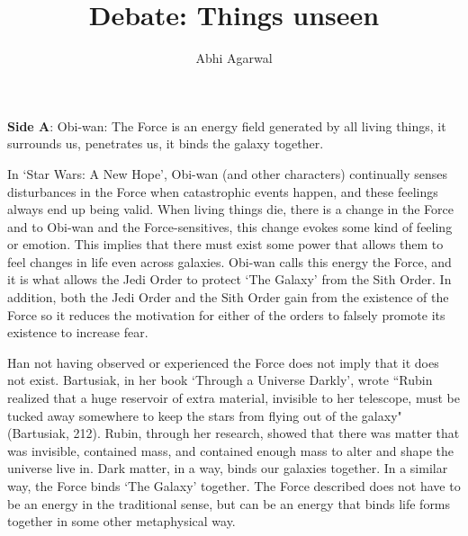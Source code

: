\documentclass[11pt, oneside]{article}
\title{Debate: Things unseen\vspace{-0.4cm}}
\author{Abhi Agarwal\vspace{-1cm}}
\date{}
\begin{document}
\maketitle

\noindent \textbf{Side A}: Obi-wan: The Force is an energy field generated by all living things, it surrounds us, penetrates us, it binds the galaxy together.

\par In `Star Wars: A New Hope', Obi-wan (and other characters) continually senses disturbances in the Force when catastrophic events happen, and these feelings always end up being valid. When living things die, there is a change in the Force and to Obi-wan and the Force-sensitives, this change evokes some kind of feeling or emotion. This implies that there must exist some power that allows them to feel changes in life even across galaxies. Obi-wan calls this energy the Force, and it is what allows the Jedi Order to protect `The Galaxy' from the Sith Order. In addition, both the Jedi Order and the Sith Order gain from the existence of the Force so it reduces the motivation for either of the orders to falsely promote its existence to increase fear.

\par Han not having observed or experienced the Force does not imply that it does not exist. Bartusiak, in her book `Through a Universe Darkly', wrote ``Rubin realized that a huge reservoir of extra material, invisible to her telescope, must be tucked away somewhere to keep the stars from flying out of the galaxy" (Bartusiak, 212). Rubin, through her research, showed that there was matter that was invisible, contained mass, and contained enough mass to alter and shape the universe live in. Dark matter, in a way, binds our galaxies together. In a similar way, the Force binds `The Galaxy' together. The Force described does not have to be an energy in the traditional sense, but can be an energy that binds life forms together in some other metaphysical way.

\end{document}
